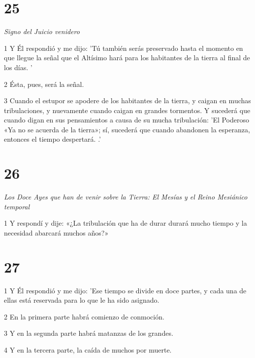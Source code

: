 \chapter{25}

\par \textit{Signo del Juicio venidero}

\par 1 Y Él respondió y me dijo: 'Tú también serás preservado hasta el momento en que llegue la señal que el Altísimo hará para los habitantes de la tierra al final de los días. '

\par 2 Ésta, pues, será la señal.

\par 3 Cuando el estupor se apodere de los habitantes de la tierra, y caigan en muchas tribulaciones, y nuevamente cuando caigan en grandes tormentos. Y sucederá que cuando digan en sus pensamientos a causa de su mucha tribulación: 'El Poderoso «Ya no se acuerda de la tierra»; sí, sucederá que cuando abandonen la esperanza, entonces el tiempo despertará. .'

\chapter{26}

\par \textit{Los Doce Ayes que han de venir sobre la Tierra: El Mesías y el Reino Mesiánico temporal}

\par 1 Y respondí y dije: «¿La tribulación que ha de durar durará mucho tiempo y la necesidad abarcará muchos años?»

\chapter{27}

\par 1 Y Él respondió y me dijo: 'Ese tiempo se divide en doce partes, y cada una de ellas está reservada para lo que le ha sido asignado.

\par 2 En la primera parte habrá comienzo de conmoción.

\par 3 Y en la segunda parte habrá matanzas de los grandes.

\par 4 Y en la tercera parte, la caída de muchos por muerte.

